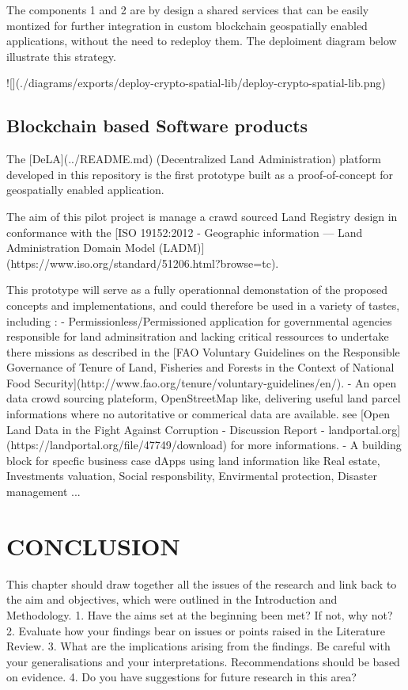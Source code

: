 \documentclass{isprs} %
\begin{document}
The components 1 and 2 are by design a shared services that can be easily montized for further integration in custom blockchain geospatially enabled applications, without the need to redeploy them. The deploiment diagram below illustrate this strategy.

![](./diagrams/exports/deploy-crypto-spatial-lib/deploy-crypto-spatial-lib.png)


\subsection{Blockchain based Software products}\label{sec:Blockchain based Software products}

The [DeLA](../README.md) (Decentralized Land Administration) platform developed in this repository is the first prototype built as a proof-of-concept for geospatially enabled application.

The aim of this pilot project is manage a crawd sourced Land Registry design in conformance with the [ISO 19152:2012 - Geographic information — Land Administration Domain Model (LADM)](https://www.iso.org/standard/51206.html?browse=tc).

This prototype will serve as a fully operationnal demonstation of the proposed concepts and implementations, and could therefore be used in a variety of tastes, including :
- Permissionless/Permissioned application for governmental agencies responsible for land adminsitration and lacking critical ressources to undertake there missions as described in the [FAO Voluntary Guidelines on the Responsible Governance of Tenure of Land, Fisheries and Forests in the Context of National Food Security](http://www.fao.org/tenure/voluntary-guidelines/en/).
- An open data crowd sourcing plateform, OpenStreetMap like, delivering useful land parcel informations where no autoritative or commerical data are available. see [Open Land Data in the Fight Against Corruption - Discussion Report - landportal.org](https://landportal.org/file/47749/download) for more informations.
- A building block for specfic business case dApps using land information like Real estate, Investments valuation, Social responsbility, Envirmental protection, Disaster management ... 

\section{CONCLUSION}\label{sec:CONCLUSION}

This chapter should draw together all the issues of the research and link back to the aim and objectives, which were outlined in the Introduction and Methodology. 1. Have the aims set at the beginning been met? If not, why not?
2. Evaluate how your findings bear on issues or points raised in the Literature Review.
3. What are the implications arising from the findings. Be careful with your generalisations and your interpretations. Recommendations should be based on evidence.
4. Do you have suggestions for future research in this area?
\end{document}
